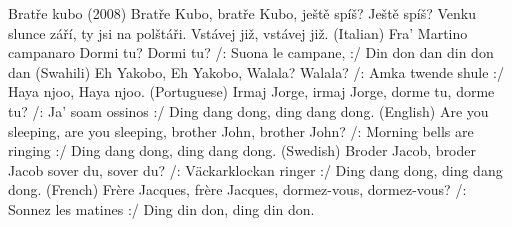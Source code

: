 \begin{TEXT}{Bratře kubo (2008)}
\SLOKA Bratře Kubo, bratře Kubo,
ještě spíš? Ještě spíš?
Venku slunce září, ty jsi na polštáři.
Vstávej již, vstávej již.
\SLOKA (Italian)
Fra’ Martino campanaro
Dormi tu? Dormi tu?
/: Suona le campane, :/
Din don dan din don dan
\SLOKA (Swahili)
Eh Yakobo, Eh Yakobo,
Walala? Walala?
/: Amka twende shule  :/
Haya njoo, Haya njoo.
\SLOKA (Portuguese)
Irmaj Jorge, irmaj Jorge,
dorme tu, dorme tu?
/: Ja' soam ossinos :/
Ding dang dong, ding dang dong.
\SLOKA (English)
Are you sleeping, are you sleeping,
brother John, brother John?
/: Morning bells are ringing :/
Ding dang dong, ding dang dong.
\SLOKA (Swedish)
Broder Jacob, broder Jacob
sover du, sover du?
/: Väckarklockan ringer :/
Ding dang dong, ding dang dong.
\SLOKA (French)
Frère Jacques, frère Jacques,
dormez-vous, dormez-vous?
/: Sonnez les matines :/
Ding din don, ding din don.
\end{TEXT}